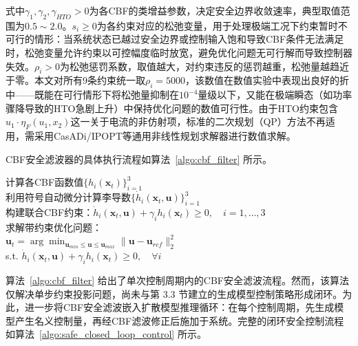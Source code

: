 式中$\gamma_1, \gamma_2, \gamma_{HTO} > 0$为各CBF的类增益参数，决定安全边界收敛速率，典型取值范围为$0.5 \sim 2.0$。$s_i \ge 0$为各约束对应的松弛变量，用于处理极端工况下约束暂时不可行的情形：当系统状态已越过安全边界或控制输入饱和导致CBF条件无法满足时，松弛变量允许约束以可控幅度临时放宽，避免优化问题无可行解而导致控制器失效。$\rho_i > 0$为松弛惩罚系数，取值越大，对约束违反的惩罚越重，松弛量越趋近于零。本文对所有9条约束统一取$\rho_i = 5000$，该数值在数值实验中表现出良好的折中——既能在可行情形下将松弛量抑制在$10^{-4}$量级以下，又能在极端瞬态（如功率骤降导致的HTO急剧上升）中保持优化问题的数值可行性。由于HTO约束包含$u_1 \cdot \eta_F(u_1, x_2)$这一关于电流的非仿射项，标准的二次规划（QP）方法不再适用，需采用CasADi/IPOPT等通用非线性规划求解器进行数值求解。

CBF安全滤波器的具体执行流程如算法~\ref{algo:cbf_filter} 所示。

\begin{algorithm}[htb]
  \caption{非仿射CBF安全滤波}
  \label{algo:cbf_filter}
  \SetAlgoLined
  计算各CBF函数值$\{h_i(\mathbf{x}_t)\}_{i=1}^3$\\
  利用符号自动微分计算李导数$\{\dot{h}_i(\mathbf{x}_t, \mathbf{u})\}_{i=1}^3$\\
  构建联合CBF约束：$\dot{h}_i(\mathbf{x}_t, \mathbf{u}) + \gamma_i h_i(\mathbf{x}_t) \ge 0,\quad i=1,\dots,3$\\
  求解带约束优化问题：\\
  \quad$\mathbf{u}_t = \arg\min_{\mathbf{u}_{min} \le \mathbf{u} \le \mathbf{u}_{max}} \|\mathbf{u} - \mathbf{u}_{ref}\|_2^2$\\
  \qquad s.t. $\dot{h}_i(\mathbf{x}_t, \mathbf{u}) + \gamma_i h_i(\mathbf{x}_t) \ge 0,\quad \forall i$\\
\end{algorithm}

算法~\ref{algo:cbf_filter} 给出了单次控制周期内的CBF安全滤波流程。然而，该算法仅解决单步约束投影问题，尚未与第 3.3 节建立的生成模型控制策略形成闭环。为此，进一步将CBF安全滤波嵌入扩散模型推理循环：在每个控制周期，先生成模型产生名义控制量，再经CBF滤波修正后施加于系统。完整的闭环安全控制流程如算法~\ref{algo:safe_closed_loop_control} 所示。

